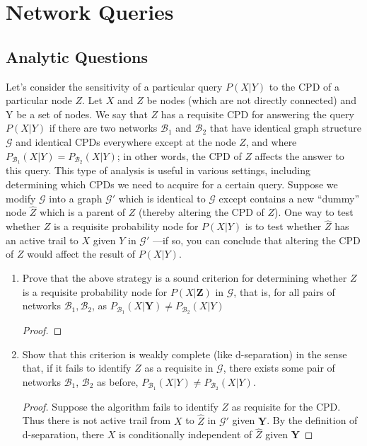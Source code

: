 \documentclass[12pt]{article}
\begin{document}
\section{Network Queries}
\subsection{Analytic Questions}
Let’s consider the sensitivity of a particular query $P(X|Y)$ to the CPD of a particular node $Z$.
Let $X$ and $Z$ be nodes (which are not directly connected) and Y be a set of nodes. We say that $Z$ has a requisite CPD for answering the query $P(X|Y)$ if there are two networks $\mathcal{B}_1$ and $\mathcal{B}_2$
that have identical graph structure $\mathcal{G}$ and identical CPDs everywhere except at the node $Z$, and
where $P_{\mathcal{B}_1}(X|Y) = P_{\mathcal{B}_2}(X|Y)$; in other words, the CPD of $Z$ aﬀects the answer to this query.
This type of analysis is useful in various settings, including determining which CPDs we need
to acquire for a certain query.
Suppose we modify $\mathcal{G}$ into a graph $\mathcal{G}'$
which is identical to $\mathcal{G}$ except contains a new ``dummy''
node $\hat{Z}$ which is a parent of $Z$ (thereby altering the CPD of $Z$). One way to test whether $Z$ is
a requisite probability node for $P(X|Y)$ is to test whether $\hat{Z}$ has an active trail to $X$ given $Y$
in $\mathcal{G}'$ 	—if so, you can conclude that altering the CPD of $Z$ would aﬀect the result of $P(X|Y)$.
\begin{enumerate}[1.]
	\item Prove that the above strategy is a sound criterion for determining whether $Z$ is a requisite probability node for $P(X|\mathbf{Z})$ in $\mathcal{G}$, that is, for all pairs of networks $\mathcal{B}_1,\mathcal{B}_2$, as $P_{\mathcal{B}_1}(X|\mathbf{Y}) \not = P_{\mathcal{B}_2}(X|Y)$ 
	\begin{proof}
	
	\end{proof}
	\item 
	Show that this criterion is weakly complete (like d-separation) in the sense that,
if it fails to identify $Z$ as a requisite in $\mathcal{G}$, there exists some pair of networks $\mathcal{B}_1$, $\mathcal{B}_2$ as before, $P_{\mathcal{B}_1}(X|Y) \not = P_{\mathcal{B}_2}(X|Y)$.
\begin{proof}
Suppose the algorithm fails to identify $Z$ as requisite for the CPD. Thus there is not active trail from $X$ to $\hat{Z}$ in $\mathcal{G}'$ given $\mathbf{Y}$. By the definition of d-separation, there $X$ is conditionally independent of $\hat{Z}$ given $\mathbf{Y}$
\end{proof}
\end{enumerate}
\end{document}
